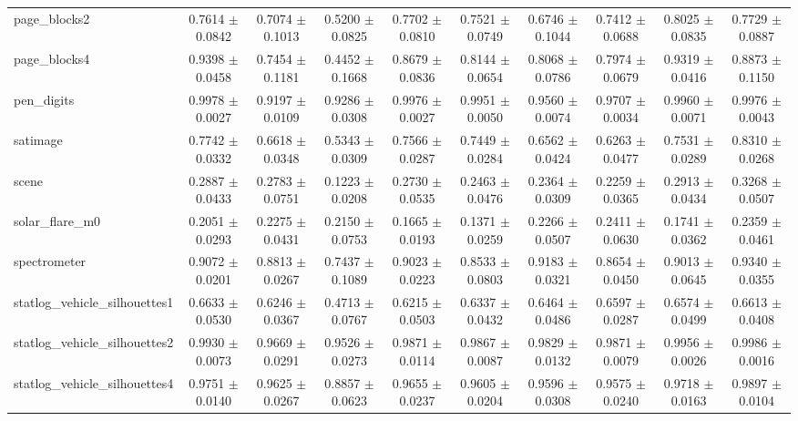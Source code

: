 \begin{table*}[htbp]
\begin{tabular}{lccccccccc}
            page\_blocks2 & 0.7614 $\pm$ 0.0842 & 0.7074 $\pm$ 0.1013 & 0.5200 $\pm$ 0.0825 & 0.7702 $\pm$ 0.0810 & 0.7521 $\pm$ 0.0749 & 0.6746 $\pm$ 0.1044 & 0.7412 $\pm$ 0.0688 & 0.8025 $\pm$ 0.0835 & 0.7729 $\pm$ 0.0887 \\ 
            page\_blocks4 & 0.9398 $\pm$ 0.0458 & 0.7454 $\pm$ 0.1181 & 0.4452 $\pm$ 0.1668 & 0.8679 $\pm$ 0.0836 & 0.8144 $\pm$ 0.0654 & 0.8068 $\pm$ 0.0786 & 0.7974 $\pm$ 0.0679 & 0.9319 $\pm$ 0.0416 & 0.8873 $\pm$ 0.1150 \\ 
            pen\_digits & 0.9978 $\pm$ 0.0027 & 0.9197 $\pm$ 0.0109 & 0.9286 $\pm$ 0.0308 & 0.9976 $\pm$ 0.0027 & 0.9951 $\pm$ 0.0050 & 0.9560 $\pm$ 0.0074 & 0.9707 $\pm$ 0.0034 & 0.9960 $\pm$ 0.0071 & 0.9976 $\pm$ 0.0043 \\ 
            satimage & 0.7742 $\pm$ 0.0332 & 0.6618 $\pm$ 0.0348 & 0.5343 $\pm$ 0.0309 & 0.7566 $\pm$ 0.0287 & 0.7449 $\pm$ 0.0284 & 0.6562 $\pm$ 0.0424 & 0.6263 $\pm$ 0.0477 & 0.7531 $\pm$ 0.0289 & 0.8310 $\pm$ 0.0268 \\ 
            scene & 0.2887 $\pm$ 0.0433 & 0.2783 $\pm$ 0.0751 & 0.1223 $\pm$ 0.0208 & 0.2730 $\pm$ 0.0535 & 0.2463 $\pm$ 0.0476 & 0.2364 $\pm$ 0.0309 & 0.2259 $\pm$ 0.0365 & 0.2913 $\pm$ 0.0434 & 0.3268 $\pm$ 0.0507 \\ 
            solar\_flare\_m0 & 0.2051 $\pm$ 0.0293 & 0.2275 $\pm$ 0.0431 & 0.2150 $\pm$ 0.0753 & 0.1665 $\pm$ 0.0193 & 0.1371 $\pm$ 0.0259 & 0.2266 $\pm$ 0.0507 & 0.2411 $\pm$ 0.0630 & 0.1741 $\pm$ 0.0362 & 0.2359 $\pm$ 0.0461 \\ 
            spectrometer & 0.9072 $\pm$ 0.0201 & 0.8813 $\pm$ 0.0267 & 0.7437 $\pm$ 0.1089 & 0.9023 $\pm$ 0.0223 & 0.8533 $\pm$ 0.0803 & 0.9183 $\pm$ 0.0321 & 0.8654 $\pm$ 0.0450 & 0.9013 $\pm$ 0.0645 & 0.9340 $\pm$ 0.0355 \\ 
            statlog\_vehicle\_silhouettes1 & 0.6633 $\pm$ 0.0530 & 0.6246 $\pm$ 0.0367 & 0.4713 $\pm$ 0.0767 & 0.6215 $\pm$ 0.0503 & 0.6337 $\pm$ 0.0432 & 0.6464 $\pm$ 0.0486 & 0.6597 $\pm$ 0.0287 & 0.6574 $\pm$ 0.0499 & 0.6613 $\pm$ 0.0408 \\ 
            statlog\_vehicle\_silhouettes2 & 0.9930 $\pm$ 0.0073 & 0.9669 $\pm$ 0.0291 & 0.9526 $\pm$ 0.0273 & 0.9871 $\pm$ 0.0114 & 0.9867 $\pm$ 0.0087 & 0.9829 $\pm$ 0.0132 & 0.9871 $\pm$ 0.0079 & 0.9956 $\pm$ 0.0026 & 0.9986 $\pm$ 0.0016 \\ 
            statlog\_vehicle\_silhouettes4 & 0.9751 $\pm$ 0.0140 & 0.9625 $\pm$ 0.0267 & 0.8857 $\pm$ 0.0623 & 0.9655 $\pm$ 0.0237 & 0.9605 $\pm$ 0.0204 & 0.9596 $\pm$ 0.0308 & 0.9575 $\pm$ 0.0240 & 0.9718 $\pm$ 0.0163 & 0.9897 $\pm$ 0.0104 \\ 

\end{tabular}
\end{table*}
